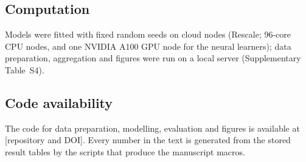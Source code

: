 \subsection{Computation}
Models were fitted with fixed random seeds on cloud nodes (Rescale; 96-core CPU nodes, and one NVIDIA A100 GPU node for the neural learners); data preparation, aggregation and figures were run on a local server (Supplementary Table~S4).

\subsection{Code availability}
The code for data preparation, modelling, evaluation and figures is available at [repository and DOI]. Every number in the text is generated from the stored result tables by the scripts that produce the manuscript macros.
